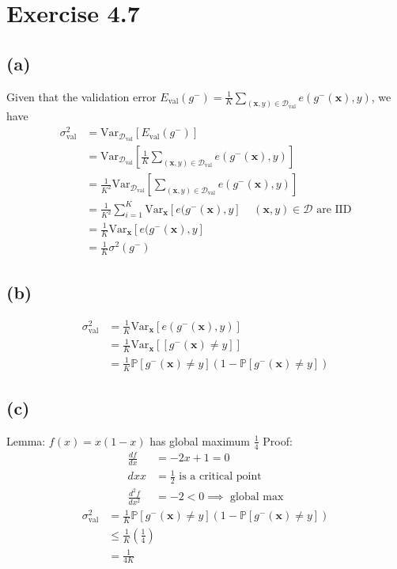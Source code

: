 \documentclass{article}
\begin{document}
	\section*{Exercise 4.7}
	\subsection*{(a)}
		Given that the validation error $E_{\text{val}}(g^-) = \frac1K \sum\limits_{(\mathbf x, y) \in \mathcal D_{\text{val}}}e(g^-(\mathbf x), y)$, we have
		\begin{align*}
			\sigma_{\text{val}}^2 &= \text{Var}_{\mathcal D_{\text{val}}}[E_{\text{val}}(g^-)]\\
			&= \text{Var}_{\mathcal D_{\text{val}}}[\frac1K \sum\limits_{(\mathbf x, y) \in \mathcal D_{\text{val}}}e(g^-(\mathbf x), y)]\\
			&= \frac1{K^2} \text{Var}_{\mathcal D_{\text{val}}}[\sum\limits_{(\mathbf x, y) \in \mathcal D_{\text{val}}}e(g^-(\mathbf x), y)]\\
			&= \frac1{K^2} \sum\limits_{i = 1}^K\text{Var}_{\mathbf x}[e(g^-(\mathbf x), y]\ \ \ \ \ (\mathbf x, y) \in \mathcal D \text{ are IID}\\
			&= \frac1K\text{Var}_{\mathbf x}[e(g^-(\mathbf x), y]\\
			&= \frac1K \sigma^2(g^-)
		\end{align*}
	\subsection*{(b)}
		\begin{align*}
			\sigma_{\text{val}}^2 &= \frac1K\text{Var}_{\mathbf x}[e(g^-(\mathbf x), y)]\\
			&= \frac1K\text{Var}_{\mathbf x}[[g^-(\mathbf x) \neq y]]\\
			&= \boxed{\frac1K\mathbb P[g^-(\mathbf x) \neq y](1 - \mathbb P[g^-(\mathbf x) \neq y]) }
		\end{align*}
		
	\subsection*{(c)}
		Lemma: $f(x) = x(1-x)$ has global maximum $\frac14$
		Proof:
		\begin{align*}
			\frac{df}{dx} &= -2x + 1 = 0\\dx
			x &= \frac12 \text{ is a critical point}\\
			\frac{d^2f}{dx^2} &= -2 < 0 \implies \text{ global max}
		\end{align*}
		\begin{align*}
			\sigma_{\text{val}}^2 &= \frac1K\mathbb P[g^-(\mathbf x) \neq y](1 - \mathbb P[g^-(\mathbf x) \neq y])\\
			&\leq \frac1K(\frac14)\\
			&= \frac1{4K}
		\end{align*}
		
\end{document}
